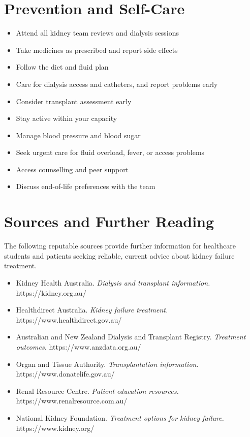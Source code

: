 \section*{Prevention and Self-Care}
\begin{itemize}
    \item Attend all kidney team reviews and dialysis sessions
    \item Take medicines as prescribed and report side effects
    \item Follow the diet and fluid plan
    \item Care for dialysis access and catheters, and report problems early
    \item Consider transplant assessment early
    \item Stay active within your capacity
    \item Manage blood pressure and blood sugar
    \item Seek urgent care for fluid overload, fever, or access problems
    \item Access counselling and peer support
    \item Discuss end-of-life preferences with the team
\end{itemize}

\section*{Sources and Further Reading}
The following reputable sources provide further information for healthcare students and patients seeking reliable, current advice about kidney failure treatment.
\begin{itemize}
    \item Kidney Health Australia. \textit{Dialysis and transplant information.} https://kidney.org.au/
    \item Healthdirect Australia. \textit{Kidney failure treatment.} https://www.healthdirect.gov.au/
    \item Australian and New Zealand Dialysis and Transplant Registry. \textit{Treatment outcomes.} https://www.anzdata.org.au/
    \item Organ and Tissue Authority. \textit{Transplantation information.} https://www.donatelife.gov.au/
    \item Renal Resource Centre. \textit{Patient education resources.} https://www.renalresource.com.au/
    \item National Kidney Foundation. \textit{Treatment options for kidney failure.} https://www.kidney.org/
\end{itemize}
